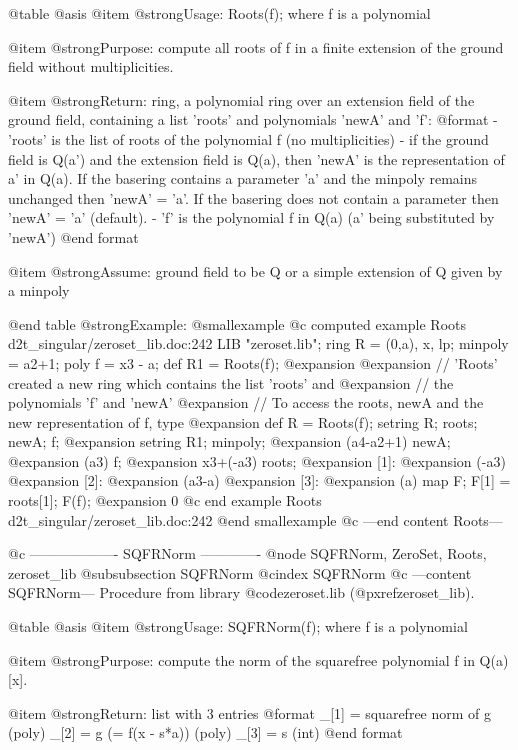 @table @asis
@item @strong{Usage:}
Roots(f); where f is a polynomial

@item @strong{Purpose:}
compute all roots of f in a finite extension of the ground field
without multiplicities.

@item @strong{Return:}
ring, a polynomial ring over an extension field of the ground field,
containing a list 'roots' and polynomials 'newA' and 'f':
  @format
  - 'roots' is the list of roots of the polynomial f (no multiplicities)
  - if the ground field is Q(a') and the extension field is Q(a), then
    'newA' is the representation of a' in Q(a). 
    If the basering contains a parameter 'a' and the minpoly remains unchanged
    then 'newA' = 'a'.
    If the basering does not contain a parameter then 'newA' = 'a' (default).
  - 'f' is the polynomial f in Q(a) (a' being substituted by 'newA')
  @end format

@item @strong{Assume:}
ground field to be Q or a simple extension of Q given by a minpoly

@end table
@strong{Example:}
@smallexample
@c computed example Roots d2t_singular/zeroset_lib.doc:242 
LIB "zeroset.lib";
ring R = (0,a), x, lp;
minpoly = a2+1;
poly f = x3 - a;
def R1 = Roots(f);
@expansion{} 
@expansion{} // 'Roots' created a new ring which contains the list 'roots' and
@expansion{} // the polynomials 'f' and 'newA'
@expansion{} // To access the roots, newA and the new representation of f, type
@expansion{}    def R = Roots(f); setring R; roots; newA; f;
@expansion{} 
setring R1;
minpoly;
@expansion{} (a4-a2+1)
newA;
@expansion{} (a3)
f;
@expansion{} x3+(-a3)
roots;
@expansion{} [1]:
@expansion{}    (-a3)
@expansion{} [2]:
@expansion{}    (a3-a)
@expansion{} [3]:
@expansion{}    (a)
map F;
F[1] = roots[1];
F(f);
@expansion{} 0
@c end example Roots d2t_singular/zeroset_lib.doc:242
@end smallexample
@c ---end content Roots---

@c ------------------- SQFRNorm -------------
@node SQFRNorm, ZeroSet, Roots, zeroset_lib
@subsubsection SQFRNorm
@cindex SQFRNorm
@c ---content SQFRNorm---
Procedure from library @code{zeroset.lib} (@pxref{zeroset_lib}).

@table @asis
@item @strong{Usage:}
SQFRNorm(f); where f is a polynomial

@item @strong{Purpose:}
compute the norm of the squarefree polynomial f in Q(a)[x].

@item @strong{Return:}
list with 3 entries
  @format
  _[1] = squarefree norm of g (poly)
  _[2] = g (= f(x - s*a)) (poly)
  _[3] = s (int)
  @end format

